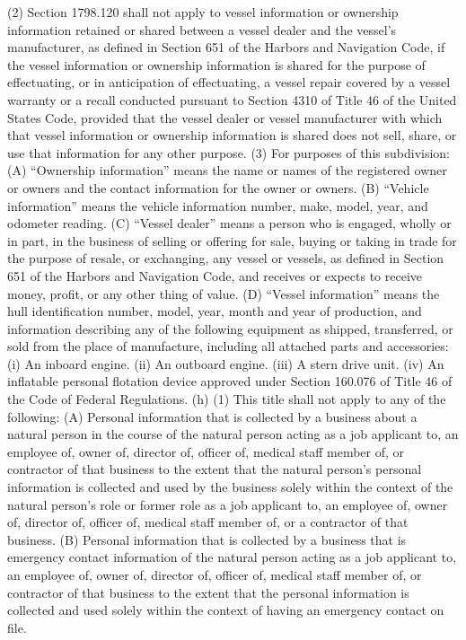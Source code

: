 (2) Section 1798.120 shall not apply to vessel information or ownership information retained or shared between a vessel dealer and the vessel’s manufacturer, as defined in Section 651 of the Harbors and Navigation Code, if the vessel information or ownership information is shared for the purpose of effectuating, or in anticipation of effectuating, a vessel repair covered by a vessel warranty or a recall conducted pursuant to Section 4310 of Title 46 of the United States Code, provided that the vessel dealer or vessel manufacturer with which that vessel information or ownership information is shared does not sell, share, or use that information for any other purpose.
(3) For purposes of this subdivision:
(A) “Ownership information” means the name or names of the registered owner or owners and the contact information for the owner or owners.
(B) “Vehicle information” means the vehicle information number, make, model, year, and odometer reading.
(C) “Vessel dealer” means a person who is engaged, wholly or in part, in the business of selling or offering for sale, buying or taking in trade for the purpose of resale, or exchanging, any vessel or vessels, as defined in Section 651 of the Harbors and Navigation Code, and receives or expects to receive money, profit, or any other thing of value.
(D) “Vessel information” means the hull identification number, model, year, month and year of production, and information describing any of the following equipment as shipped, transferred, or sold from the place of manufacture, including all attached parts and accessories:
(i) An inboard engine.
(ii) An outboard engine.
(iii) A stern drive unit.
(iv) An inflatable personal flotation device approved under Section 160.076 of Title 46 of the Code of Federal Regulations.
(h) (1) This title shall not apply to any of the following:
(A) Personal information that is collected by a business about a natural person in the course of the natural person acting as a job applicant to, an employee of, owner of, director of, officer of, medical staff member of, or contractor of that business to the extent that the natural person’s personal information is collected and used by the business solely within the context of the natural person’s role or former role as a job applicant to, an employee of, owner of, director of, officer of, medical staff member of, or a contractor of that business.
(B) Personal information that is collected by a business that is emergency contact information of the natural person acting as a job applicant to, an employee of, owner of, director of, officer of, medical staff member of, or contractor of that business to the extent that the personal information is collected and used solely within the context of having an emergency contact on file.

